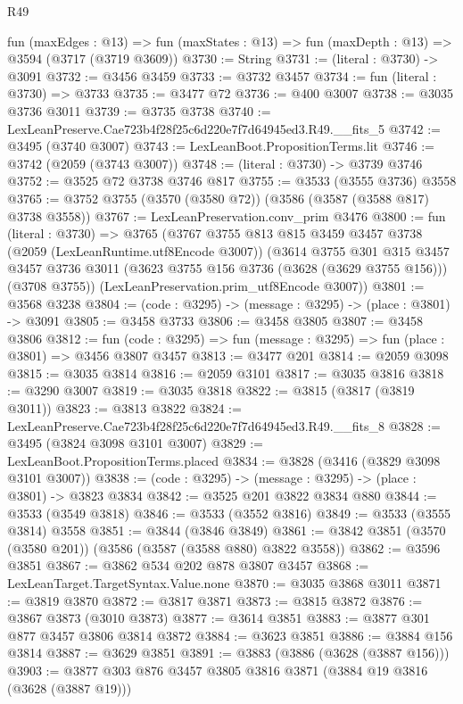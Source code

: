 \begin{lexlean}{R49}
\begin{coremodule}
  fun (maxEdges : @13) =>
  fun (maxStates : @13) => fun (maxDepth : @13) => @3594 (@3717 (@3719 @3609))
@3730 := String
@3731 := (literal : @3730) -> @3091
@3732 := @3456 @3459
@3733 := @3732 @3457
@3734 := fun (literal : @3730) => @3733
@3735 := @3477 @72
@3736 := @400 @3007
@3738 := @3035 @3736 @3011
@3739 := @3735 @3738
@3740 := LexLeanPreserve.Cae723b4f28f25c6d220e7f7d64945ed3.R49.__fits_5
@3742 := @3495 (@3740 @3007)
@3743 := LexLeanBoot.PropositionTerms.lit
@3746 := @3742 (@2059 (@3743 @3007))
@3748 := (literal : @3730) -> @3739 @3746
@3752 := @3525 @72 @3738 @3746 @817
@3755 := @3533 (@3555 @3736) @3558
@3765 := @3752 @3755 (@3570 (@3580 @72)) (@3586 (@3587 (@3588 @817) @3738 @3558))
@3767 := LexLeanPreservation.conv_prim @3476
@3800 := fun (literal : @3730) =>
  @3765
    (@3767
      @3755
      @813
      @815
      @3459
      @3457
      @3738
      (@2059 (LexLeanRuntime.utf8Encode @3007))
      (@3614
        @3755
        @301
        @315
        @3457
        @3457
        @3736
        @3011
        (@3623 @3755 @156 @3736 (@3628 (@3629 @3755 @156)))
        (@3708 @3755))
      (LexLeanPreservation.prim_utf8Encode @3007))
@3801 := @3568 @3238
@3804 := (code : @3295) -> (message : @3295) -> (place : @3801) -> @3091
@3805 := @3458 @3733
@3806 := @3458 @3805
@3807 := @3458 @3806
@3812 := fun (code : @3295) => fun (message : @3295) => fun (place : @3801) => @3456 @3807 @3457
@3813 := @3477 @201
@3814 := @2059 @3098
@3815 := @3035 @3814
@3816 := @2059 @3101
@3817 := @3035 @3816
@3818 := @3290 @3007
@3819 := @3035 @3818
@3822 := @3815 (@3817 (@3819 @3011))
@3823 := @3813 @3822
@3824 := LexLeanPreserve.Cae723b4f28f25c6d220e7f7d64945ed3.R49.__fits_8
@3828 := @3495 (@3824 @3098 @3101 @3007)
@3829 := LexLeanBoot.PropositionTerms.placed
@3834 := @3828 (@3416 (@3829 @3098 @3101 @3007))
@3838 := (code : @3295) -> (message : @3295) -> (place : @3801) -> @3823 @3834
@3842 := @3525 @201 @3822 @3834 @880
@3844 := @3533 (@3549 @3818)
@3846 := @3533 (@3552 @3816)
@3849 := @3533 (@3555 @3814) @3558
@3851 := @3844 (@3846 @3849)
@3861 := @3842 @3851 (@3570 (@3580 @201)) (@3586 (@3587 (@3588 @880) @3822 @3558))
@3862 := @3596 @3851
@3867 := @3862 @534 @202 @878 @3807 @3457
@3868 := LexLeanTarget.TargetSyntax.Value.none
@3870 := @3035 @3868 @3011
@3871 := @3819 @3870
@3872 := @3817 @3871
@3873 := @3815 @3872
@3876 := @3867 @3873 (@3010 @3873)
@3877 := @3614 @3851
@3883 := @3877 @301 @877 @3457 @3806 @3814 @3872
@3884 := @3623 @3851
@3886 := @3884 @156 @3814
@3887 := @3629 @3851
@3891 := @3883 (@3886 (@3628 (@3887 @156)))
@3903 := @3877 @303 @876 @3457 @3805 @3816 @3871 (@3884 @19 @3816 (@3628 (@3887 @19)))

\end{coremodule}
\end{lexlean}
